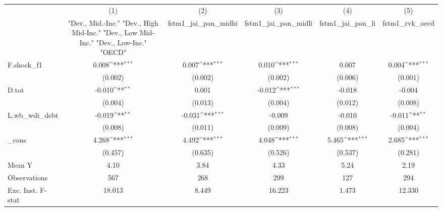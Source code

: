 {
\def\sym#1{\ifmmode^{#1}\else\(^{#1}\)\fi}
\begin{tabular}{l*{5}{c}}
\toprule
            &\multicolumn{1}{c}{(1)}&\multicolumn{1}{c}{(2)}&\multicolumn{1}{c}{(3)}&\multicolumn{1}{c}{(4)}&\multicolumn{1}{c}{(5)}\\
            &\multicolumn{1}{c}{ "Dev., Mid.-Inc." "Dev., High Mid-Inc." "Dev., Low Mid-Inc." "Dev., Low-Inc." "OECD" }&\multicolumn{1}{c}{fstm1\_jai\_pan\_midhi}&\multicolumn{1}{c}{fstm1\_jai\_pan\_midli}&\multicolumn{1}{c}{fstm1\_jai\_pan\_li}&\multicolumn{1}{c}{fstm1\_rvk\_oecd}\\
\midrule
F.shock\_f1  &       0.008\sym{***}&       0.007\sym{***}&       0.010\sym{***}&       0.007         &       0.004\sym{***}\\
            &     (0.002)         &     (0.002)         &     (0.002)         &     (0.006)         &     (0.001)         \\
\addlinespace
D.tot       &      -0.010\sym{**} &       0.001         &      -0.012\sym{***}&      -0.018         &      -0.004         \\
            &     (0.004)         &     (0.013)         &     (0.004)         &     (0.012)         &     (0.008)         \\
\addlinespace
L.wb\_wdi\_debt&      -0.019\sym{**} &      -0.031\sym{***}&      -0.009         &      -0.010         &      -0.011\sym{**} \\
            &     (0.008)         &     (0.011)         &     (0.009)         &     (0.008)         &     (0.004)         \\
\addlinespace
\_cons      &       4.268\sym{***}&       4.492\sym{***}&       4.048\sym{***}&       5.465\sym{***}&       2.685\sym{***}\\
            &     (0.457)         &     (0.635)         &     (0.526)         &     (0.537)         &     (0.281)         \\
\midrule
Mean Y      &        4.10         &        3.84         &        4.33         &        5.24         &        2.19         \\
Observations&         567         &         268         &         299         &         127         &         294         \\
Exc. Inst. F-stat&      18.013         &       8.449         &      16.223         &       1.473         &      12.330         \\
\bottomrule
\end{tabular}
}
